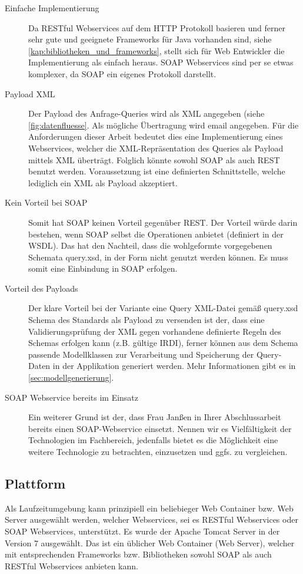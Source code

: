 \begin{description}
\item[Einfache Implementierung] Da \gls{REST}ful Webservices auf dem HTTP Protokoll basieren und ferner sehr gute und geeignete Frameworks für Java vorhanden sind, siehe \autoref{kap:bibliotheken_und_frameworks}, stellt sich für Web Entwickler die Implementierung als einfach heraus. \gls{SOAP} \glspl{Webservice} sind per se etwas komplexer, da \gls{SOAP} ein eigenes Protokoll darstellt. 
\item[Payload XML] Der Payload des Anfrage-Queries wird als XML angegeben (siehe \autoref{fig:datenfluesse}. Als mögliche Übertragung wird email angegeben. Für die Anforderungen dieser Arbeit bedeutet dies eine Implementierung eines \glspl{Webservice}, welcher die XML-Repräsentation des Queries als Payload mittels XML überträgt. Folglich könnte sowohl \gls{SOAP} als auch \gls{REST} benutzt werden. Voraussetzung ist eine definierten Schnittstelle, welche lediglich ein XML als Payload akzeptiert. 
\item[Kein Vorteil bei SOAP] Somit hat \gls{SOAP} keinen Vorteil gegenüber \gls{REST}. Der Vorteil würde darin bestehen, wenn \gls{SOAP} selbst die Operationen anbietet (definiert in der \gls{WSDL}). Das hat den Nachteil, dass die wohlgeformte vorgegebenen Schemata query.xsd, in der Form nicht genutzt werden können. Es muss somit eine Einbindung in \gls{SOAP} erfolgen.
 \item[Vorteil des Payloads] Der klare Vorteil bei der Variante eine Query XML-Datei gemäß query.xsd Schema des Standards als Payload zu versenden ist der, dass eine Validierungsprüfung der XML gegen vorhandene definierte Regeln des Schemas erfolgen kann (z.B. gültige \gls{IRDI}), ferner können aus dem Schema passende Modellklassen zur Verarbeitung und Speicherung der Query-Daten in der Applikation generiert werden. Mehr Informationen gibt es in \autoref{sec:modellgenerierung}. 
\item[SOAP Webservice bereits im Einsatz] Ein weiterer Grund ist der, dass Frau Janßen in Ihrer Abschlussarbeit bereits einen SOAP-Webservice einsetzt. Nennen wir es Vielfältigkeit der Technologien im Fachbereich, jedenfalls bietet es die Möglichkeit eine weitere Technologie zu betrachten, einzusetzen und ggfs. zu vergleichen. 
\end{description}

\subsection{Plattform}  \label{sec:plattform}
Als Laufzeitumgebung kann prinzipiell ein beliebieger Web Container bzw. Web Server ausgewählt werden, welcher Webservices, sei es \gls{REST}ful \glspl{Webservice} oder \gls{SOAP} \glspl{Webservice}, unterstützt. 
Es wurde der \gls{Apache Tomcat} Server in der Version 7 ausgewählt. Das ist ein üblicher Web Container (Web Server), welcher mit entsprechenden Frameworks bzw. Bibliotheken sowohl \gls{SOAP} als auch \gls{REST}ful \glspl{Webservice} anbieten kann. 

